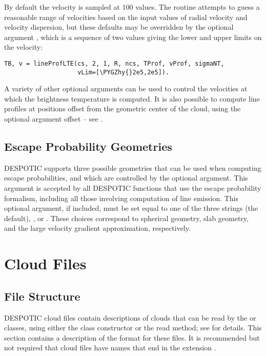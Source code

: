 \documentclass[letterpaper,10pt,english]{sphinxmanual}
\def\PYGZhy{\char`\-}
\begin{document}
By default the velocity is sampled at 100 values. The routine attempts
to guess a reasonable range of velocities based on the input values of
radial velocity and velocity dispersion, but these defaults may be
overridden by the optional argument , which is a sequence of
two values giving the lower and upper limits on the velocity:

\begin{Verbatim}[commandchars=\\\{\}]
TB, v = lineProfLTE(cs, 2, 1, R, ncs, TProf, vProf, sigmaNT,
                    vLim=[\PYGZhy{}2e5,2e5]).
\end{Verbatim}

A variety of other optional arguments can be used to control the
velocities at which the brightness temperature is computed. It is also
possible to compute line profiles at positions offset from the
geometric center of the cloud, using the optional argument offset --
see {\hyperref[fulldoc:sssec\string-full\string-lineproflte]{}}.


\section{Escape Probability Geometries}
\label{functions:escape-probability-geometries}
DESPOTIC supports three possible geometries that can be used when
computing escape probabilities, and which are controlled by the
 optional argument. This argument is accepted by all
DESPOTIC functions that use the escape probability formalism,
including all those involving computation of line emission. This
optional argument, if included, must be set equal to one of the three
strings  (the default), , or . These choices
correspond to spherical geometry, slab geometry, and the large
velocity gradient approximation, respectively.


\chapter{Cloud Files}
\label{cloudfiles:sec-cloudfiles}\label{cloudfiles::doc}\label{cloudfiles:cloud-files}

\section{File Structure}
\label{cloudfiles:file-structure}
DESPOTIC cloud files contain descriptions of clouds that can be read
by the  or  classes, using either the class
constructor or the read method; see {\hyperref[fulldoc:sssec\string-full\string-cloud]{}} for
details. This section contains a description of the format for these
files. It is recommended but not required that cloud files have names
that end in the extension .
\end{document}

